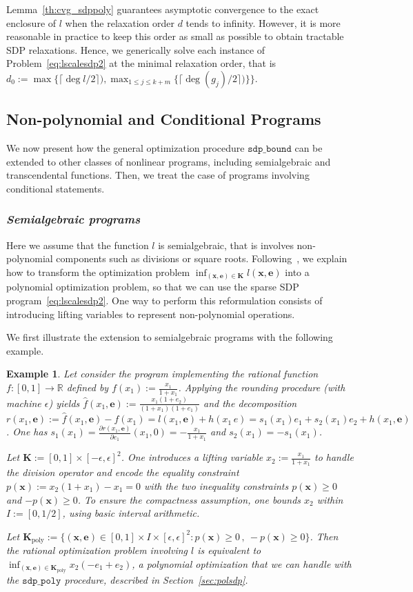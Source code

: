 \documentclass[preprint]{sigplanconf}
\newcommand{\R}{\mathbb{R}}
\newcommand{\x}{\mathbf{x}}
\newcommand{\e}{\mathbf{e}}
\def\K{\mathbf{K}}
\newcommand{\Kpol}{\K_{\text{poly}}}
\newcommand{\sdpbound}{\mathtt{sdp\_bound}}
\newcommand{\sdppoly}{\mathtt{sdp\_poly}}
\theoremstyle{plain}
\newtheorem{example}{Example}
\begin{document}
%
Lemma~\ref{th:cvg_sdppoly} guarantees asymptotic convergence to the exact enclosure of $l$ when the relaxation order $d$ tends to infinity. However, it is more reasonable in practice to keep this order as small as possible to obtain tractable SDP relaxations. Hence, we generically solve each instance of Problem~\eqref{eq:lscalesdp2} at the minimal relaxation order, that is $d_0 := \max \{\lceil \deg l / 2\rceil) , \max_{1 \leq j \leq k+m} \{ \lceil \deg (g_j) / 2\rceil) \} \}$. 
%
\subsection{Non-polynomial and Conditional Programs}
\label{sec:nonpolsdp}
We now present how the general optimization procedure $\sdpbound$ can be extended to other classes of nonlinear programs, including semialgebraic and transcendental functions. Then, we treat the case of programs involving conditional statements.
%
\subsubsection*{\textit{Semialgebraic programs}} 
Here we assume that the function $l$ is semialgebraic, that is involves non-polynomial components such as divisions or square roots.
Following~\cite{LasPut10}, we explain how to transform the optimization problem $\inf_{(\x,\e) \in \K} l (\x, \e)$ into a polynomial optimization problem, so that we can use the sparse SDP program~\eqref{eq:lscalesdp2}. One way to perform this reformulation consists of introducing lifting variables to represent non-polynomial operations.

We first illustrate the extension to semialgebraic programs with the following example.
\begin{example}
Let consider the program implementing the rational function $f : [0, 1] \to \R$ defined by $f(x_1) := \frac{x_1}{1 + x_1}$. Applying the rounding procedure (with machine $\epsilon$) yields $\hat{f}(x_1,\e) := \frac{x _1(1 + e_2)}{(1 + x_1)(1 + e_1)}$ and the decomposition $r(x_1, \e) := \hat{f}(x_1,\e) - f(x_1) = l(x_1,\e) + h(x_1\,e) = s_1 (x_1) e_1 + s_2 (x_1) e_2 + h(x_1,\e)$. One has $s_1(x_1) = \frac{\partial r(x_1,\e)} {\partial e_1} (x_1,0) = -\frac{x_1}{1 + x_1}$ and $s_2(x_1) = - s_1(x_1)$.

Let $\K := [0, 1] \times [-\epsilon, \epsilon]^2$. One introduces a lifting variable $x_2 := \frac{x_1}{1 + x_1}$ to handle the division operator and encode the equality constraint $p(\x) :=  x_2 (1 + x_1) - x_1 = 0$ with the two inequality constraints $p (\x) \geq 0$ and $-p(\x) \geq 0$. To ensure the compactness assumption, one bounds $x_2$ within $I := [0, 1/2]$, using basic interval arithmetic.

Let $\Kpol := \{(\x,\e) \in [0, 1] \times I \times [\epsilon, \epsilon]^2 : p(\x) \geq 0 \,,\  - p(\x) \geq 0 \}$. Then the rational optimization problem involving $l$ is equivalent to $\inf_{(\x,\e) \in \Kpol} x_2 (-e_1 + e_2)$, a polynomial optimization that we can handle with the $\sdppoly$ procedure, described in Section~\ref{sec:polsdp}.
\end{example}
%
\end{document}
